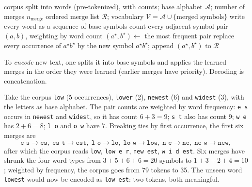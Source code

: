\begin{algorithm}[t]
\caption{Training a byte-pair-encoding vocabulary.}\label{alg:c01-bpe}
\begin{algorithmic}[1]
\Require corpus split into words (pre-tokenized), with counts; base alphabet $\mathcal{A}$; number of merges $n_{\mathrm{merge}}$
\Ensure ordered merge list $\mathcal{R}$; vocabulary $\mathcal{V} = \mathcal{A} \cup \{\text{merged symbols}\}$
\State write every word as a sequence of base symbols
  \State count every adjacent symbol pair $(a, b)$, weighting by word count
  \State $(a^\star, b^\star) \gets$ the most frequent pair
  \State replace every occurrence of $a^\star b^\star$ by the new symbol $a^\star b^\star$; append $(a^\star, b^\star)$ to $\mathcal{R}$
\EndFor
\end{algorithmic}
\end{algorithm}

To \emph{encode} new text, one splits it into base symbols and applies the learned merges in
the order they were learned (earlier merges have priority). Decoding is concatenation.

\begin{example}\label{ex:c01-bpe}
Take the corpus \texttt{low} (5 occurrences), \texttt{lower} (2), \texttt{newest} (6) and
\texttt{widest} (3), with the letters as base alphabet. The pair counts are weighted by word
frequency: \texttt{e s} occurs in \texttt{newest} and \texttt{widest}, so it has count
$6 + 3 = 9$; \texttt{s t} also has count 9; \texttt{w e} has $2 + 6 = 8$; \texttt{l o} and
\texttt{o w} have 7. Breaking ties by first occurrence, the first six merges are
\[
\texttt{e s} \to \texttt{es},\;
\texttt{es t} \to \texttt{est},\;
\texttt{l o} \to \texttt{lo},\;
\texttt{lo w} \to \texttt{low},\;
\texttt{n e} \to \texttt{ne},\;
\texttt{ne w} \to \texttt{new},
\]
after which the corpus reads \texttt{low}, \texttt{low e r}, \texttt{new est},
\texttt{w i d est}. Six merges have shrunk the four word types from $3+5+6+6 = 20$ symbols
to $1+3+2+4 = 10$; weighted by frequency, the corpus goes from 79 tokens to 35. The unseen
word \texttt{lowest} would now be encoded as \texttt{low est}: two tokens, both
meaningful.
\end{example}

